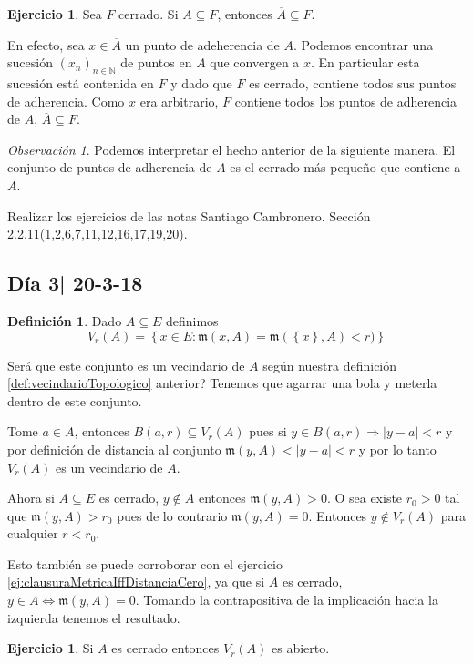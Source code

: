 \documentclass[12pt]{article}
\theoremstyle{plain}
\theoremstyle{definition}
\newtheorem{Def}[Th]{Definición}       %
\newtheorem{Ej}[Th]{Ejercicio}
\theoremstyle{remark}
\newtheorem{Rmk}[Th]{Observación}      %
\numberwithin{equation}{section}
\newcommand{\bN}{\mathbb{N}}        %
\newcommand{\mm}{\mathfrak{m}}      %
\renewcommand{\:}{\colon}           %
\newcommand{\conj}[1]{\left\lbrace#1\right\rbrace}
\begin{document}
\begin{multicols}{2}
\begin{ptcbp}
\end{ptcbp}

\begin{Ej}
  Sea $F$ cerrado. Si $A\subseteq F$, entonces $\overline{A}\subseteq F$.
\end{Ej}

\begin{ptcb}
En efecto, sea $x\in\overline{A}$ un punto de adeherencia de $A$. Podemos encontrar una sucesión $(x_n)_{n\in\bN}$ de puntos en $A$ que convergen a $x$. En particular esta sucesión está contenida en $F$ y dado que $F$ es cerrado, contiene todos sus puntos de adherencia. Como $x$ era arbitrario, $F$ contiene todos los puntos de adherencia de $A$, $\overline{A}\subseteq F$.
\end{ptcb}

\begin{Rmk}
  Podemos interpretar el hecho anterior de la siguiente manera. El conjunto de puntos de adherencia de $A$ es el cerrado más pequeño que contiene a $A$.
\end{Rmk}
Realizar los ejercicios de las notas Santiago Cambronero. Sección 2.2.11(1,2,6,7,11,12,16,17,19,20).

\subsection{Día 3| 20-3-18}

\begin{Def}\label{def:bolasEspacioMetrico}
  Dado $A\subseteq E$ definimos
  $$V_r(A)=\conj{x\in E\colon \mm(x,A)=\mm(\conj{x},A)<r)}$$
\end{Def}
Será que este conjunto es un vecindario de $A$ según nuestra definición \ref{def:vecindarioTopologico} anterior?
Tenemos que agarrar una bola y meterla dentro de este conjunto.\par
Tome $a\in A$, entonces $B(a,r)\subseteq V_r(A)$ pues si $y\in B(a,r)\Rightarrow |y-a|<r$ y por definición de distancia al conjunto $\mm(y,A)<|y-a|<r$ y por lo tanto $V_r(A)$ es un vecindario de $A$.\par
Ahora si $A\subseteq E$ es cerrado, $y\not\in A$ entonces $\mm(y,A)>0$. O sea existe $r_0>0$ tal que $\mm(y,A)>r_0$ pues de lo contrario $\mm(y,A)=0$. Entonces $y\not\in V_r(A)$ para cualquier $r<r_0$.\par Esto también se puede corroborar con el ejercicio \ref{ej:clausuraMetricaIffDistanciaCero}, ya que si $A$ es cerrado, $y\in A\iff\mm(y,A)=0$. Tomando la contrapositiva de la implicación hacia la izquierda tenemos el resultado.
\begin{Ej}
  Si $A$ es cerrado entonces $V_r(A)$ es abierto.
\end{Ej}


\end{multicols}
\end{document}
